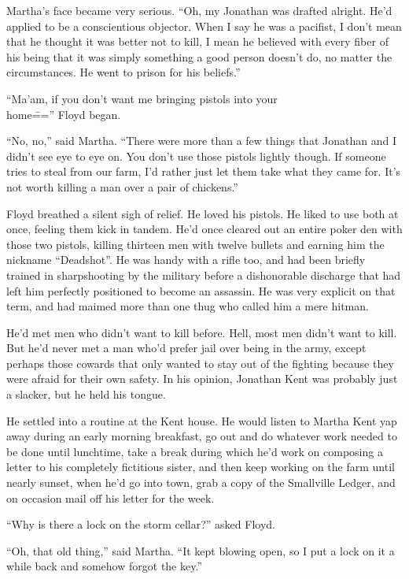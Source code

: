\documentclass[ebook,12pt]{memoir}
\begin{document}
Martha's face became very serious. ``Oh, my Jonathan was drafted
alright. He'd applied to be a conscientious objector. When I say he was
a pacifist, I don't mean that he thought it was better not to kill, I
mean he believed with every fiber of his being that it was simply
something a good person doesn't do, no matter the circumstances. He went
to prison for his beliefs.''

``Ma'am, if you don't want me bringing pistols into your \\ home\==='' Floyd
began.

``No, no,'' said Martha. ``There were more than a few things that
Jonathan and I didn't see eye to eye on. You don't use those pistols
lightly though. If someone tries to steal from our farm, I'd rather just
let them take what they came for. It's not worth killing a man over a
pair of chickens.''

Floyd breathed a silent sigh of relief. He loved his pistols. He liked
to use both at once, feeling them kick in tandem. He'd once cleared out
an entire poker den with those two pistols, killing thirteen men with
twelve bullets and earning him the nickname ``Deadshot''. He was handy
with a rifle too, and had been briefly trained in sharpshooting by the
military before a dishonorable discharge that had left him perfectly
positioned to become an assassin. He was very explicit on that term, and
had maimed more than one thug who called him a mere hitman.

He'd met men who didn't want to kill before. Hell, most men didn't want
to kill. But he'd never met a man who'd prefer jail over being in the
army, except perhaps those cowards that only wanted to stay out of the
fighting because they were afraid for their own safety. In his opinion,
Jonathan Kent was probably just a slacker, but he held his tongue.

He settled into a routine at the Kent house. He would listen to Martha
Kent yap away during an early morning breakfast, go out and do whatever
work needed to be done until lunchtime, take a break during which he'd
work on composing a letter to his completely fictitious sister, and then
keep working on the farm until nearly sunset, when he'd go into town,
grab a copy of the Smallville Ledger, and on occasion mail off his
letter for the week.

``Why is there a lock on the storm cellar?'' asked Floyd.

``Oh, that old thing,'' said Martha. ``It kept blowing open, so I put a
lock on it a while back and somehow forgot the key.''
\end{document}
